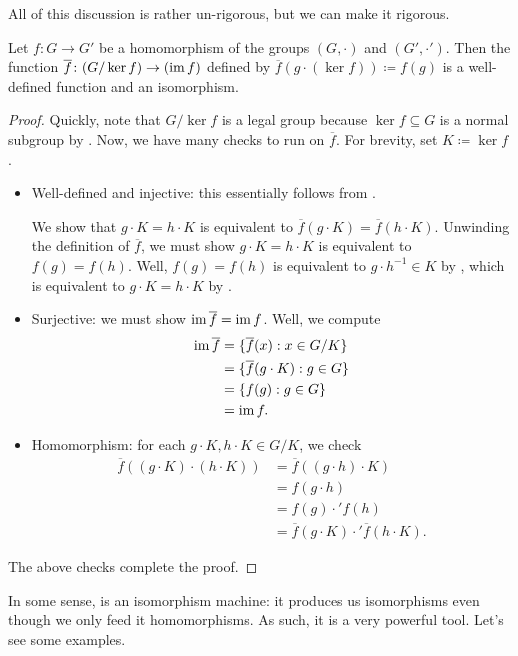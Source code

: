 \documentclass[../main.tex]{subfiles}
\begin{document}
All of this discussion is rather un-rigorous, but we can make it rigorous.
\begin{theorem}[homomorphism] \label{thm:hom}
    Let $f\colon G\to G'$ be a homomorphism of the groups $(G,\cdot)$ and $(G',\cdot')$. Then the function $\overline f\colon(G/\ker f)\to(\operatorname{im} f)$ defined by $\overline f(g\cdot(\ker f))\coloneqq f(g)$ is a well-defined function and an isomorphism.
\end{theorem}
\begin{proof}
    Quickly, note that $G/\ker f$ is a legal group because $\ker f\subseteq G$ is a normal subgroup by . Now, we have many checks to run on $\overline f$. For brevity, set $K\coloneq\ker f$.
    \begin{itemize}
        \item Well-defined and injective: this essentially follows from .
        
        We show that $g\cdot K=h\cdot K$ is equivalent to $\overline f(g\cdot K)=\overline f(h\cdot K)$. Unwinding the definition of $\overline f$, we must show $g\cdot K=h\cdot K$ is equivalent to $f(g)=f(h)$. Well, $f(g)=f(h)$ is equivalent to $g\cdot h^{-1}\in K$ by , which is equivalent to $g\cdot K=h\cdot K$ by .
        \item Surjective: we must show $\operatorname{im}\overline f=\operatorname{im} f$. Well, we compute
        \begin{align*}
            \operatorname{im}\overline f &= \{\overline f(x):x\in G/K\} \\
            &= \{\overline f(g\cdot K):g\in G\} \\
            &= \{f(g):g\in G\} \\
            &= \operatorname{im} f.
        \end{align*}
        \item Homomorphism: for each $g\cdot K,h\cdot K\in G/K$, we check
        \begin{align*}
            \overline f((g\cdot K)\cdot(h\cdot K)) &= \overline f((g\cdot h)\cdot K) \\
            &= f(g\cdot h) \\
            &= f(g)\cdot'f(h) \\
            &= \overline f(g\cdot K)\cdot'\overline f(h\cdot K).
        \end{align*}
    \end{itemize}
    The above checks complete the proof.
\end{proof}
In some sense,  is an isomorphism machine: it produces us isomorphisms even though we only feed it homomorphisms. As such, it is a very powerful tool. Let's see some examples.
\end{document}
